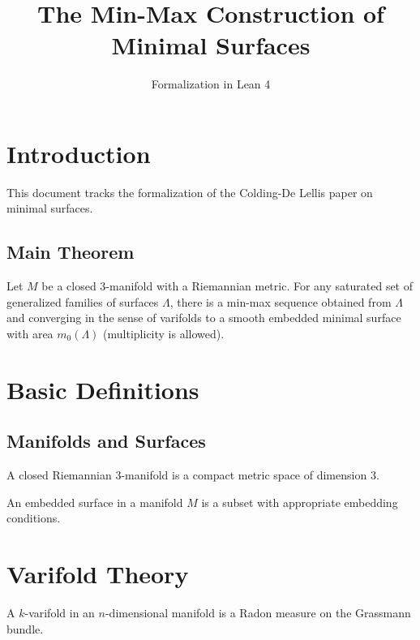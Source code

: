 \documentclass{report}
\title{The Min-Max Construction of Minimal Surfaces}
\author{Formalization in Lean 4}
\begin{document}
\maketitle

\chapter{Introduction}

This document tracks the formalization of the Colding-De Lellis paper on minimal surfaces.

\section{Main Theorem}

\begin{theorem}
\label{thm:simon_smith}
Let $M$ be a closed 3-manifold with a Riemannian metric. For any saturated set 
of generalized families of surfaces $\Lambda$, there is a min-max sequence obtained 
from $\Lambda$ and converging in the sense of varifolds to a smooth embedded minimal 
surface with area $m_0(\Lambda)$ (multiplicity is allowed).
\end{theorem}

\chapter{Basic Definitions}

\section{Manifolds and Surfaces}

\begin{definition}
\label{def:closed_riemannian_3_manifold}
A closed Riemannian 3-manifold is a compact metric space of dimension 3.
\end{definition}

\begin{definition}
\label{def:embedded_surface}
An embedded surface in a manifold $M$ is a subset with appropriate embedding conditions.
\end{definition}

\chapter{Varifold Theory}

\begin{definition}[Varifold]
\label{def:varifold}
A $k$-varifold in an $n$-dimensional manifold is a Radon measure on the Grassmann bundle.
\end{definition}
\end{document}
